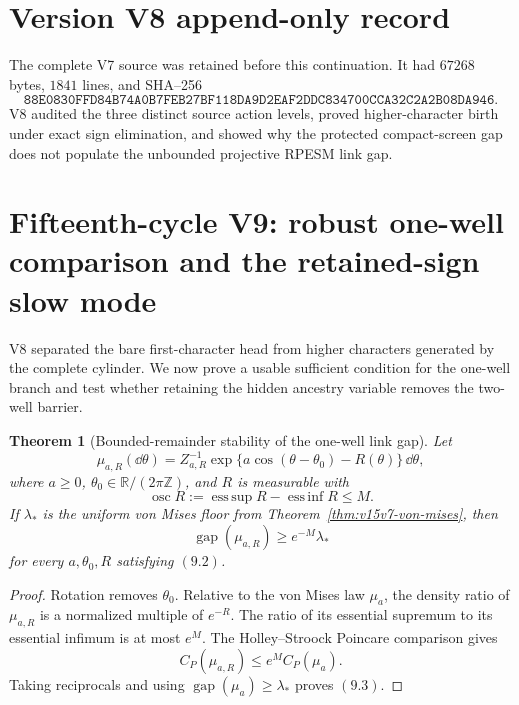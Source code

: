 \documentclass[11pt]{article}
\newtheorem{theorem}{Theorem}[section]
\theoremstyle{remark}
\begin{document}
\section*{Version V8 append-only record}
The complete V7 source was retained before this continuation.  It
had \(67268\) bytes, \(1841\) lines, and SHA--256
\[
 \texttt{88E0830FFD84B74A0B7FEB27BF118DA9D2EAF2DDC834700CCA32C2A2B08DA946}.
\]
V8 audited the three distinct source action levels, proved
higher-character birth under exact sign elimination, and showed
why the protected compact-screen gap does not populate the
unbounded projective RPESM link gap.





\section{Fifteenth-cycle V9: robust one-well comparison and the retained-sign slow mode}
\label{sec:v15v9}

V8 separated the bare first-character head from higher characters
generated by the complete cylinder.  We now prove a usable
sufficient condition for the one-well branch and test whether
retaining the hidden ancestry variable removes the two-well
barrier.

\begin{theorem}[Bounded-remainder stability of the one-well link gap]
\label{thm:v15v9-bounded-remainder}
Let
\[
 \mu_{a,R}(\dd\theta)
 =Z_{a,R}^{-1}
 \exp\{a\cos(\theta-\theta_0)-R(\theta)\}\,\dd\theta,         \tag{9.1}
\]
where \(a\ge0\), \(\theta_0\in\mathbb R/(2\pi\mathbb Z)\), and
\(R\) is measurable with
\[
 \operatorname{osc}R
 :=\operatorname*{ess\,sup}R-
   \operatorname*{ess\,inf}R\le M.                           \tag{9.2}
\]
If \(\lambda_*\) is the uniform von Mises floor from
Theorem~\ref{thm:v15v7-von-mises}, then
\[
 \boxed{\operatorname{gap}(\mu_{a,R})
 \ge e^{-M}\lambda_*}                                       \tag{9.3}
\]
for every \(a,\theta_0,R\) satisfying \((9.2)\).
\end{theorem}

\begin{proof}
Rotation removes \(\theta_0\).  Relative to the von Mises law
\(\mu_a\), the density ratio of \(\mu_{a,R}\) is a normalized
multiple of \(e^{-R}\).  The ratio of its essential supremum to
its essential infimum is at most \(e^M\).  The
Holley--Stroock Poincare comparison gives
\[
 C_P(\mu_{a,R})\le e^M C_P(\mu_a).
\]
Taking reciprocals and using
\(\operatorname{gap}(\mu_a)\ge\lambda_*\) proves \((9.3)\).
\end{proof}
\end{document}
